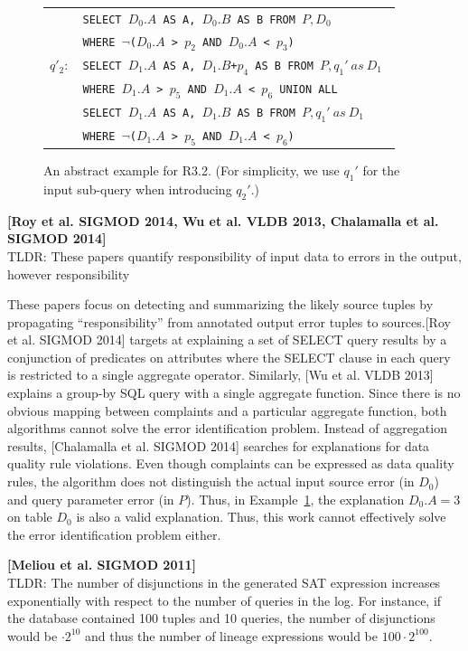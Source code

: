 \begin{figure}[t]
\begin{minipage}[t]{0.22\textwidth}
\begin{tabular}{p{2ex}p{55ex}}
        & \texttt{\small SELECT $D_0.A$ AS A, $D_0.B$ AS B FROM $P, D_0$ }\\
        &\texttt{\small  WHERE $\neg$($D_0.A$ > $p_2$ AND $D_0.A$ < $p_3$)} \\
        $q'_2:$ &
         \texttt{\small SELECT $D_1.A$ AS A, $D_1.B$+$p_4$ AS B FROM $P, q_1'\ as\ D_1$ } \\
        & \texttt{\small WHERE $D_1.A$ > $p_5$ AND $D_1.A$ < $p_6$ UNION ALL}\\
        & \texttt{\small SELECT $D_1.A$ AS A, $D_1.B$ AS B FROM $P, q_1'\ as\ D_1$ }\\
        &\texttt{\small  WHERE $\neg$($D_1.A$ > $p_5$ AND $D_1.A$ < $p_6$)} \\
        \end{tabular}
    \end{minipage}
    \caption{An abstract example for R3.2. (For simplicity, we use $q_1'$ for the input sub-query when introducing $q_2'$.)}
\label{fig:example}
\end{figure}

\noindent \textbf{[Roy et al. SIGMOD 2014, Wu et al. VLDB 2013, Chalamalla et al. SIGMOD 2014]} \\
TLDR: These papers quantify responsibility of input data to errors in the output, however responsibility


These papers focus on detecting and summarizing the likely source tuples by propagating ``responsibility'' from annotated output error tuples to sources.[Roy et al. SIGMOD 2014] targets at explaining a set of SELECT query results by a conjunction of predicates on attributes where the SELECT clause in each query is restricted to a single aggregate operator. 
Similarly, [Wu et al. VLDB 2013] explains a group-by SQL query with a single aggregate function. Since there is no obvious mapping between complaints and a particular aggregate function, both algorithms cannot solve the error identification problem. Instead of aggregation results, [Chalamalla et al. SIGMOD 2014] searches for explanations for data quality rule violations. Even though complaints can be expressed as data quality rules, the algorithm does not distinguish the actual input source error (in $D_0$) and query parameter error (in $P$). Thus, in Example~\ref{fig:example}, the explanation $D_0.A = 3$ on table $D_0$ is also a valid explanation. Thus, this work cannot effectively solve the error identification problem either.

\noindent \textbf{[Meliou et al. SIGMOD 2011]} \\
TLDR: The number of disjunctions in the generated SAT expression increases exponentially with respect to the number of queries in the log.  For instance, if the database contained 100 tuples and 10 queries, the number of disjunctions would be $\cdot 2^{10}$ and thus the number of lineage expressions would be $100\cdot 2^{100}$.

